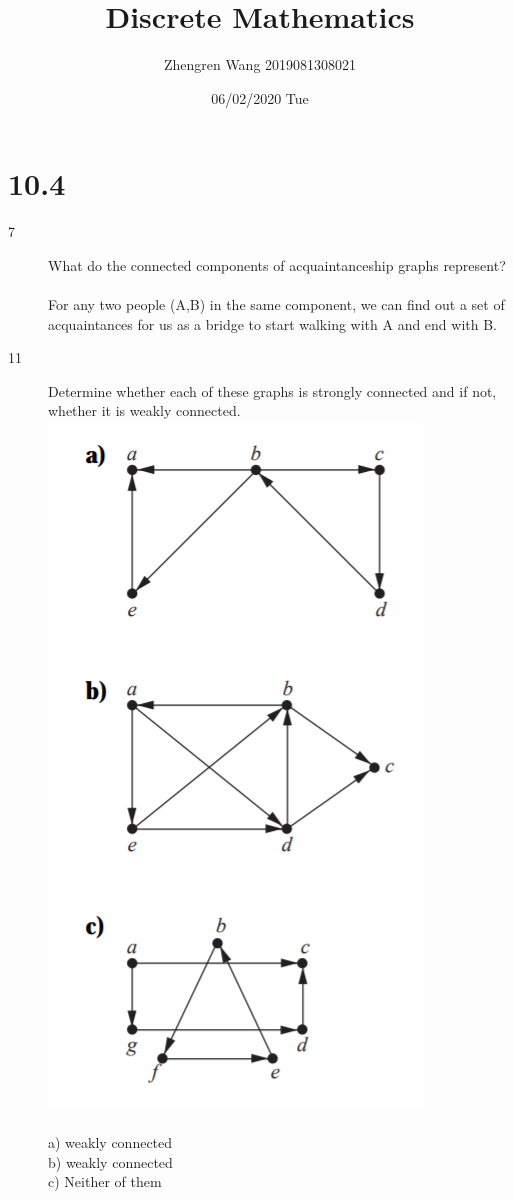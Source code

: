 \documentclass[UTF8]{article}
\title{Discrete Mathematics}
\author{Zhengren Wang 2019081308021}
\date{06/02/2020 Tue}
\begin{document}
\maketitle 

\part{10.4}
\begin{description}
    \item[7]What do the connected components of acquaintanceship graphs represent?\\\\
        For any two people (A,B) in the same component, we can find out a set of acquaintances for us as a bridge to start walking with A and end with B.


    \item[11]Determine whether each of these graphs is strongly connected and if not, whether it is weakly connected.  \\
        \includegraphics[scale=0.3]{../imgs/10_4_11.png}\\\\
            a) weakly connected                \\
            b) weakly connected                \\
            c) Neither of them\\


\end{description}
\end{document}
